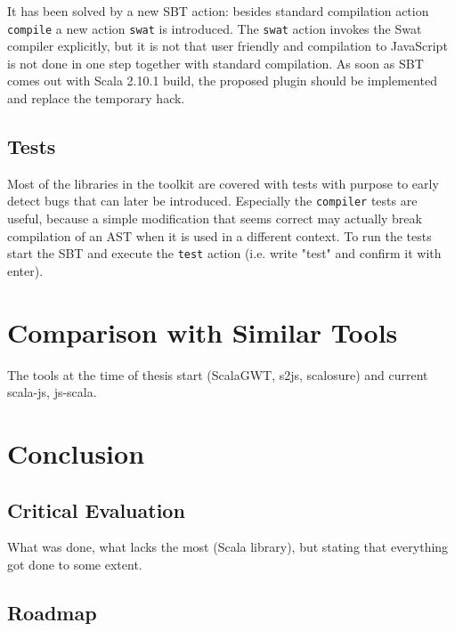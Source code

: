 \documentclass[12pt,a4paper]{report}
\begin{document}
It has been solved by a new SBT action: besides standard compilation action \texttt{compile} a new action \texttt{swat} is introduced. The \texttt{swat} action invokes the Swat compiler explicitly, but it is not that user friendly and compilation to JavaScript is not done in one step together with standard compilation. As soon as SBT comes out with Scala 2.10.1 build, the proposed plugin should be implemented and replace the temporary hack.

\section{Tests}

Most of the libraries in the toolkit are covered with tests with purpose to early detect bugs that can later be introduced. Especially the \texttt{compiler} tests are useful, because a simple modification that seems correct may actually break compilation of an AST when it is used in a different context. To run the tests start the SBT and execute the \texttt{test} action (i.e. write "test" and confirm it with enter).



\chapter{Comparison with Similar Tools}

The tools at the time of thesis start (ScalaGWT, s2js, scalosure) and current scala-js, js-scala.



\chapter{Conclusion}

\section{Critical Evaluation}

What was done, what lacks the most (Scala library), but stating that everything got done to some extent.

\section{Roadmap}
\end{document}
